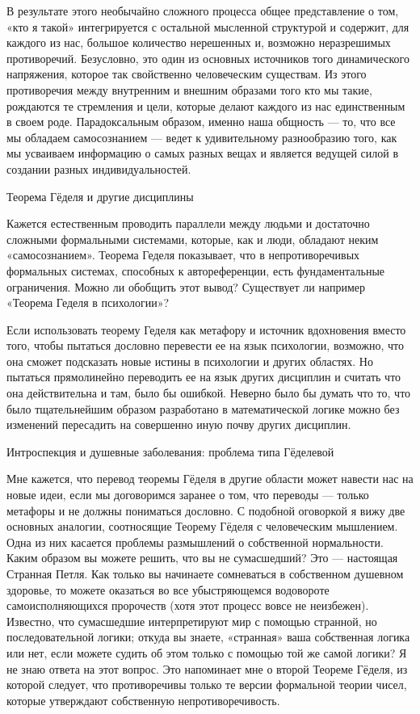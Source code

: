 В результате этого необычайно сложного процесса общее представление о том, «кто я такой» интегрируется с остальной мысленной структурой и содержит, для каждого из нас, большое количество нерешенных и, возможно неразрешимых противоречий. Безусловно, это один из основных источников того динамического напряжения, которое так свойственно человеческим существам. Из этого противоречия между внутренним и внешним образами того кто мы такие, рождаются те стремления и цели, которые делают каждого из нас единственным в своем роде. Парадоксальным образом, именно наша общность --- то, что все мы обладаем самосознанием --- ведет к удивительному разнообразию того, как мы усваиваем информацию о самых разных вещах и является ведущей силой в создании разных индивидуальностей.

Теорема Гёделя и другие дисциплины

Кажется естественным проводить параллели между людьми и достаточно сложными формальными системами, которые, как и люди, обладают неким «самосознанием». Теорема Геделя показывает, что в непротиворечивых формальных системах, способных к автореференции, есть фундаментальные ограничения. Можно ли обобщить этот вывод? Существует ли например «Теорема Геделя в психологии»?

Если использовать теорему Геделя как метафору и источник вдохновения вместо того, чтобы пытаться дословно перевести ее на язык психологии, возможно, что она сможет подсказать новые истины в психологии и других областях. Но пытаться прямолинейно переводить ее на язык других дисциплин и считать что она действительна и там, было бы ошибкой. Неверно было бы думать что то, что было тщательнейшим образом разработано в математической логике можно без изменений пересадить на совершенно иную почву других дисциплин.

Интроспекция и душевные заболевания: проблема типа Гёделевой

Мне кажется, что перевод теоремы Гёделя в другие области может навести нас на новые идеи, если мы договоримся заранее о том, что переводы --- только метафоры и не должны пониматься дословно. С подобной оговоркой я вижу две основных аналогии, соотносящие Теорему Гёделя с человеческим мышлением. Одна из них касается проблемы размышлений о собственной нормальности. Каким образом вы можете решить, что вы не сумасшедший? Это --- настоящая Странная Петля. Как только вы начинаете сомневаться в собственном душевном здоровье, то можете оказаться во все убыстряющемся водовороте самоисполняющихся пророчеств (хотя этот процесс вовсе не неизбежен). Известно, что сумасшедшие интерпретируют мир с помощью странной, но последовательной логики; откуда вы знаете, «странная» ваша собственная логика или нет, если можете судить об этом только с помощью той же самой логики? Я не знаю ответа на этот вопрос. Это напоминает мне о второй Теореме Гёделя, из которой следует, что противоречивы только те версии формальной теории чисел, которые утверждают собственную непротиворечивость.

